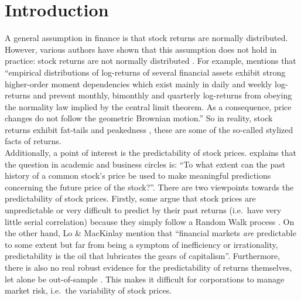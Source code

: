 \documentclass[a4paper, twoside]{templates/ociamthesis}
\begin{document}
\hypertarget{introduction}{%
\chapter*{Introduction}\label{introduction}}

\adjustmtc
{}

\noindent A general assumption in finance is that stock returns are normally distributed. However, various authors have shown that this assumption does not hold in practice: stock returns are not normally distributed \autocites[Among which][]{theodossiou2000,subbotin1923,theodossiou2015}. For example, \textcite{theodossiou2000} mentions that ``empirical distributions of log-returns of several financial assets exhibit strong higher-order moment dependencies which exist mainly in daily and weekly log-returns and prevent monthly, bimonthly and quarterly log-returns from obeying the normality law implied by the central limit theorem. As a consequence, price changes do not follow the geometric Brownian motion.'' So in reality, stock returns exhibit fat-tails and peakedness \autocite{Officer1972}, these are some of the so-called stylized facts of returns.~\\

\noindent Additionally, a point of interest is the predictability of stock prices. \textcite{fama1965} explains that the question in academic and business circles is: ``To what extent can the past history of a common stock's price be used to make meaningful predictions concerning the future price of the stock?''. There are two viewpoints towards the predictability of stock prices. Firstly, some argue that stock prices are unpredictable or very difficult to predict by their past returns (i.e.~have very little serial correlation) because they simply follow a Random Walk process \autocite{Fama1970}. On the other hand, Lo \& MacKinlay mention that ``financial markets \emph{are} predictable to some extent but far from being a symptom of inefficiency or irrationality, predictability is the oil that lubricates the gears of capitalism''. Furthermore, there is also no real robust evidence for the predictability of returns themselves, let alone be out-of-sample \autocite{welch2008}. This makes it difficult for corporations to manage market risk, i.e.~the variability of stock prices. ~\\
\end{document}
